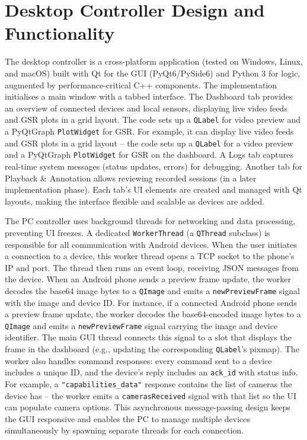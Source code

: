 \section{Desktop Controller Design and Functionality}\label{sec:4-3}
The desktop controller is a cross-platform application (tested on Windows, Linux, and macOS) built with Qt for the GUI (PyQt6/PySide6) \cite{ref17} and Python 3 for logic, augmented by performance-critical C++ components. The implementation initialises a main window with a tabbed interface. The Dashboard tab provides an overview of connected devices and local sensors, displaying live video feeds and GSR plots in a grid layout. The code sets up a \texttt{QLabel} for video preview and a PyQtGraph \texttt{PlotWidget} for GSR. For example, it can display live video feeds and GSR plots in a grid layout -- the code sets up a \texttt{QLabel} for a video preview and a PyQtGraph \texttt{PlotWidget} for GSR on the dashboard. A Logs tab captures real-time system messages (status updates, errors) for debugging. Another tab for Playback \& Annotation allows reviewing recorded sessions (in a later implementation phase). Each tab's UI elements are created and managed with Qt layouts, making the interface flexible and scalable as devices are added.

The PC controller uses background threads for networking and data processing, preventing UI freezes. A dedicated \texttt{WorkerThread} (a \texttt{QThread} subclass) is responsible for all communication with Android devices. When the user initiates a connection to a device, this worker thread opens a TCP socket to the phone's IP and port. The thread then runs an event loop, receiving JSON messages from the device. When an Android phone sends a preview frame update, the worker decodes the base64 image bytes to a \texttt{QImage} and emits a \texttt{newPreviewFrame} signal with the image and device ID. For instance, if a connected Android phone sends a preview frame update, the worker decodes the base64-encoded image bytes to a \texttt{QImage} and emits a \texttt{newPreviewFrame} signal carrying the image and device identifier. The main GUI thread connects this signal to a slot that displays the frame in the dashboard (e.g., updating the corresponding \texttt{QLabel}'s pixmap). The worker also handles command responses: every command sent to a device includes a unique ID, and the device's reply includes an \texttt{ack\_id} with status info. For example, a \texttt{"capabilities\_data"} response contains the list of cameras the device has -- the worker emits a \texttt{camerasReceived} signal with that list so the UI can populate camera options. This asynchronous message-passing design keeps the GUI responsive and enables the PC to manage multiple devices simultaneously by spawning separate threads for each connection.


